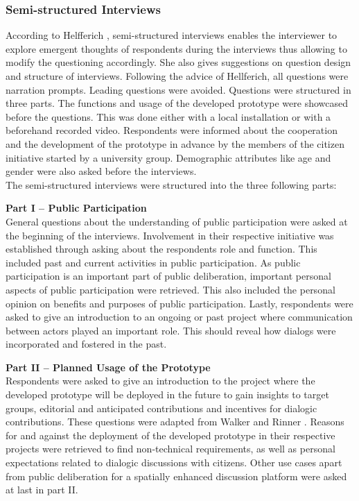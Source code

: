 \subsubsection{Semi-structured Interviews}
According to Helfferich \cite{helfferich2005}, semi-structured interviews enables the interviewer to explore emergent thoughts of respondents during the interviews thus allowing to modify the questioning accordingly. She also gives suggestions on question design and structure of interviews. Following the advice of Hellferich, all questions were narration prompts. Leading questions were avoided. Questions were structured in three parts. The functions and usage of the developed prototype were showcased before the questions. This was done either with a local installation or with a beforehand recorded video. Respondents were informed about the cooperation and the development of the prototype in advance by the members of the citizen initiative started by a university group. Demographic attributes like age and gender were also asked before the interviews.\\
The semi-structured interviews were structured into the three following parts:

\textbf{Part I -- Public Participation}\\
General questions about the understanding of public participation were asked at the beginning of the interviews. Involvement in their respective initiative was established through asking about the respondents role and function. This included past and current activities in public participation. As public participation is an important part of public deliberation, important personal aspects of public participation were retrieved. This also included the personal opinion on benefits and purposes of public participation. Lastly, respondents were asked to give an introduction to an ongoing or past project where communication between actors played an important role. This should reveal how dialogs were incorporated and fostered in the past.

\textbf{Part II -- Planned Usage of the Prototype}\\
Respondents were asked to give an introduction to the project where the developed prototype will be deployed in the future to gain insights to target groups, editorial and anticipated contributions and incentives for dialogic contributions. These questions were adapted from Walker and Rinner \cite{Walker2013Qualitative}. Reasons for and against the deployment of the developed prototype in their respective projects were retrieved to find non-technical requirements, as well as personal expectations related to dialogic discussions with citizens. Other use cases apart from public deliberation for a spatially enhanced discussion platform were asked at last in part II.

